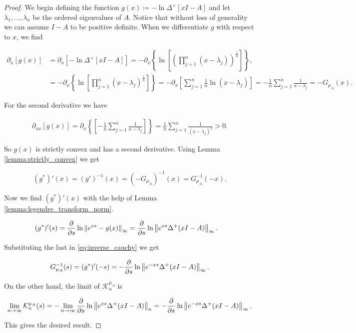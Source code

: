 \begin{proof}
    
    We begin defining the function $g(x) \coloneqq -\ln \Delta^+[xI - A]$ and let $\lambda_1, \dots, \lambda_n$ be the ordered eigenvalues of $A$. Notice that without loss of generality we can assume $I-A$ to be positive definite. When we differentiate $g$ with respect to $x$, we find 

    \begin{align*}
        \partial_x [g(x)] &= \partial_x \left[-\ln \Delta^+[xI - A]\right] = -\partial_x \left\{ \ln\left[ \left(\prod_{j=1}^n (x - \lambda_j) \right)^{\frac1n}\right] \right\}, \\
        &= -\partial_x \left\{\ln \left[ \prod_{j=1}^n (x-\lambda_j)^{\frac1n} \right]\right\} = - \partial_x \left[\sum_{j=1}^n \frac1n \ln (x-\lambda_j)\right] = -\frac1n \sum_{j=1}^n  \frac1{x-\lambda_j} = - G_{\mu_A}(x).
    \end{align*}

    For the second derivative we have

    \begin{align*}
        \partial_{xx} [g(x)] = \partial_x \left\{\left[ -\frac1n \sum_{j=1}^n  \frac1{x-\lambda_j} \right] \right\}= \frac1n \sum_{j=1}^n \frac{1}{(x-\lambda_j)^2} > 0.
    \end{align*}

    So $g(x)$ is strictly convex and has a second derivative. Using Lemma \ref{lemma:strictly_convex} we get 

    \begin{equation} \label{eq:inverse_cauchy}
        (g^*)'(x) = (g')^{-1}(x) = (-G_{\mu_A})^{-1}(x) = G_{\mu_A}^{-1}(-x).
    \end{equation}

    Now we find $(g^*)'(x)$ with the help of Lemma \ref{lemma:legendre_transform_norm}.

    \begin{align*}
        (g^*)'(s) &= \frac{\partial}{\partial s} \ln \left\lVert e^{xs} - g(x) \right\rVert_\infty = \frac{\partial}{\partial s} \ln \left\lVert e^{xs} \Delta^+(xI - A) \right\rVert_\infty.
    \end{align*}

    Substituting the last in \eqref{eq:inverse_cauchy} we get 

    \begin{equation*}
        G_{\mu_A}^{-1}(s) = (g^*)'(-s) = -\frac{\partial}{\partial s} \ln \left\lVert e^{-xs} \Delta^+(xI - A) \right\rVert_\infty.
    \end{equation*}

    On the other hand, the limit of $\mathcal K_n^{\mu_A}$ is 

    \begin{equation*}
        \lim_{n\to\infty}  \mathcal K_n^{\mu_A}(s) = - \lim_{n\to\infty} \frac{\partial}{\partial s} \ln \left\lVert e^{xs}\Delta^+(xI - A) \right\rVert_n =  -\frac{\partial}{\partial s} \ln \left\lVert e^{-xs} \Delta^+(xI - A) \right\rVert_\infty.
    \end{equation*}

    This gives the desired result.
\end{proof}


